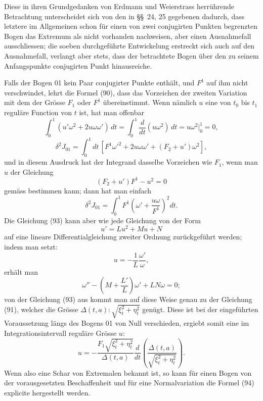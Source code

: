 \documentclass[11pt,a4paper,leqno]{article}
\begin{document}
Diese in ihren Grundgedanken von Erdmann und Weierstrass herrührende Betrachtung unterscheidet sich von den in \S\S~24, 25 gegebenen dadurch, dass letztere im Allgemeinen schon für einen von zwei conjugirten Punkten begrenzten Bogen das Extremum als nicht vorhanden nachweisen, aber einen Ausnahmefall ausschliessen; die soeben durchgeführte Entwickelung erstreckt sich auch auf den Ausnahmefall, verlangt aber stets, dass der betrachtete Bogen über den zu seinem Anfangspunkte conjugirten Punkt hinausreiche.

Falls der Bogen 01 kein Paar conjugirter Punkte enthält, und $F^1$ auf ihm nicht verschwindet, lehrt die Formel (90), dass das Vorzeichen der zweiten Variation mit dem der Grösse $F_1$ oder $F^1$ übereinstimmt. Wenn nämlich $u$ eine von $t_0$ bis $t_1$ reguläre Function von $t$ ist, hat man offenbar
\[
\int_0^1(u'\omega^2+2u\omega\omega')\,dt
=\int_0^1\frac{d}{dt}(u\omega^2)\,dt
=u\omega^2\bigg|_0^1=0,
\]
\begin{equation}\tag{92}
\delta^2J_{01}=\int_0^1dt\,[F^1\omega'^2+2u\omega\omega'+(F_2+u')\omega^2],
\end{equation}
und in diesem Ausdruck hat der Integrand dasselbe Vorzeichen wie $F_1$, wenn man $u$ der Gleichung
\begin{equation}\tag{93}
(F_2+u')F^1-u^2=0
\end{equation}
gemäss bestimmen kann; dann hat man einfach
\begin{equation}\tag{94}
\delta^2J_{01}=\int_0^1F^1\left(\omega'+\frac{u\omega}{F^1}\right)^2dt.
\end{equation}
Die Gleichung (93) kann aber wie jede Gleichung von der Form
\[
u'=Lu^2+Mu+N
\]
auf eine lineare Differentialgleichung zweiter Ordnung zurückgeführt werden; indem man setzt:
\[
u=-\frac1L\frac{\omega'}{\omega},
\]
erhält man
\[
\omega''-\left(M+\frac{L'}L\right)\omega'+LN\omega=0;
\]
von der Gleichung (93) aus kommt man auf diese Weise genau zu der Gleichung (91), welcher die Grösse $\Delta(t,a):\sqrt{\xi_t^2+\eta_t^2}$ genügt. Diese ist bei der eingeführten Voraussetzung längs des Bogens 01 von Null verschieden, ergiebt somit eine im Integrationsintervall reguläre Grösse $u$:
\[
u=-\frac{F_1\sqrt{\xi_t^2+\eta_t^2}}{\Delta(t,a)}\frac{d}{dt}\left(\frac{\Delta(t,a)}{\sqrt{\xi_t^2+\eta_t^2}}\right).
\]
Wenn also eine Schar von Extremalen bekannt ist, so kann für einen Bogen von der vorausgesetzten Beschaffenheit und für eine Normalvariation die Formel (94) explicite hergestellt werden.
\end{document}
